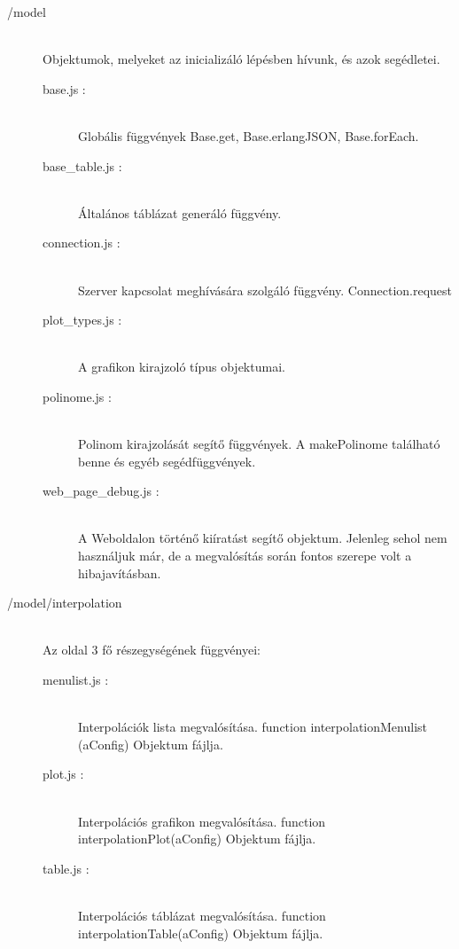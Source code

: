\begin{description}
		\item[/model] \hfill \\ 
		Objektumok, melyeket az inicializáló lépésben hívunk, és azok segédletei.
		\begin{description}
		 	\item[base.js : ] \hfill \\
		 		Globális függvények \newline
		 		Base.get, Base.erlangJSON, Base.forEach.
		 	\item[base\_table.js : ] \hfill \\
		 		Általános táblázat generáló függvény.
		 	\item[connection.js : ] \hfill \\
		 		Szerver kapcsolat meghívására szolgáló függvény. \newline
		 		Connection.request
		 	\item[plot\_types.js : ] \hfill \\
		 		A grafikon kirajzoló típus objektumai.
		 	\item[polinome.js : ] \hfill \\  
		 		Polinom kirajzolását segítő függvények. \newline
		 		A makePolinome található benne és egyéb segédfüggvények.
		 	\item[web\_page\_debug.js : ] \hfill \\ 
		 		A Weboldalon történő kiíratást segítő objektum. \newline
		 		Jelenleg sehol nem használjuk már, de a megvalósítás során fontos szerepe volt a hibajavításban.
		\end{description}
		\item[/model/interpolation] \hfill \\
			Az oldal 3 fő részegységének függvényei:
			\begin{description}
			\item[menulist.js : ] \hfill \\ 
				Interpolációk lista megvalósítása. \newline
				function interpolationMenulist (aConfig) Objektum fájlja.
		  	\item[plot.js : ] \hfill \\ 
		  		Interpolációs grafikon megvalósítása. \newline
				function interpolationPlot(aConfig) Objektum fájlja.
			\item[table.js : ] \hfill \\
				Interpolációs táblázat megvalósítása. \newline
				function interpolationTable(aConfig) Objektum fájlja.
			\end{description}


\end{description}
